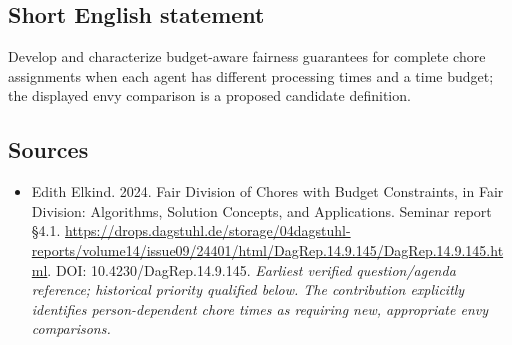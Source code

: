 \documentclass[11pt]{article}
\begin{document}
\subsection{Short English statement}
Develop and characterize budget-aware fairness guarantees for complete chore assignments when each agent has different processing times and a time budget; the displayed envy comparison is a proposed candidate definition.

\subsection{Sources}
\begin{itemize}\raggedright
\item[\textnormal{[S1]}]\hypertarget{source:30007559:1}{} Edith Elkind. 2024. Fair Division of Chores with Budget Constraints, in Fair Division: Algorithms, Solution Concepts, and Applications. Seminar report §4.1.
\url{https://drops.dagstuhl.de/storage/04dagstuhl-reports/volume14/issue09/24401/html/DagRep.14.9.145/DagRep.14.9.145.html}.
DOI: 10.4230/DagRep.14.9.145.
{\small\textit{Earliest verified question/agenda reference; historical priority qualified below. The contribution explicitly identifies person-dependent chore times as requiring new, appropriate envy comparisons.}}
\end{itemize}
\end{document}
